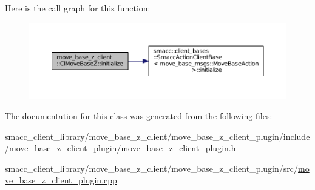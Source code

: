 Here is the call graph for this function\+:
\nopagebreak
\begin{figure}[H]
\begin{center}
\leavevmode
\includegraphics[width=350pt]{classmove__base__z__client_1_1ClMoveBaseZ_a082cef8bf5dbd0ec06adfe2a7aefbf70_cgraph}
\end{center}
\end{figure}




The documentation for this class was generated from the following files\+:\begin{DoxyCompactItemize}
\item 
smacc\+\_\+client\+\_\+library/move\+\_\+base\+\_\+z\+\_\+client/move\+\_\+base\+\_\+z\+\_\+client\+\_\+plugin/include/move\+\_\+base\+\_\+z\+\_\+client\+\_\+plugin/\hyperlink{move__base__z__client__plugin_8h}{move\+\_\+base\+\_\+z\+\_\+client\+\_\+plugin.\+h}\item 
smacc\+\_\+client\+\_\+library/move\+\_\+base\+\_\+z\+\_\+client/move\+\_\+base\+\_\+z\+\_\+client\+\_\+plugin/src/\hyperlink{move__base__z__client__plugin_8cpp}{move\+\_\+base\+\_\+z\+\_\+client\+\_\+plugin.\+cpp}\end{DoxyCompactItemize}
